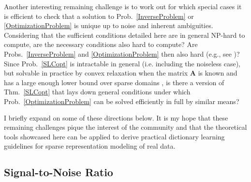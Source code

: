 Another interesting remaining challenge is to work out for which special cases it is efficient to check that a solution to Prob.~\ref{InverseProblem} or \ref{OptimizationProblem} is unique up to noise and inherent ambiguities. Considering that the sufficient conditions detailed here are in general NP-hard to compute, are the necessary conditions also hard to compute? Are Probs.~\ref{InverseProblem} and \ref{OptimizationProblem} then also hard (e.g., see \cite{tillmann2015computational})? Since Prob.~\ref{SLCopt} is intractable in general (i.e. including the noiseless case), but solvable in practice by convex relaxation when the matrix $\mathbf{A}$ is known and has a large enough lower bound over sparse domains \cite{eldar2012compressed}, is there a version of Thm.~\ref{SLCopt} that lays down general conditions under which Prob.~\ref{OptimizationProblem} can be solved efficiently in full by similar means?  %



I briefly expand on some of these directions below. It is my hope that these remaining challenges pique the interest of the community and that the theoretical tools showcased here can be applied to derive practical dictionary learning guidelines for sparse representation modeling of real data. 


\subsection{Signal-to-Noise Ratio}

